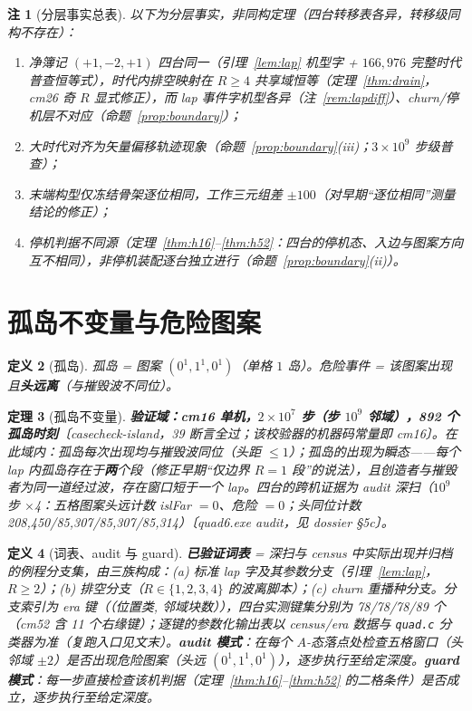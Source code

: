 \documentclass[11pt]{ctexart}
\newtheorem{theorem}{定理}[section]
\newtheorem{definition}[theorem]{定义}
\newtheorem{remark}[theorem]{注}
\begin{document}
\begin{remark}[分层事实总表]
以下为分层事实，非同构定理（四台转移表各异，转移级同构不存在）：
\begin{enumerate}
\item 净簿记 $(+1,-2,+1)$ 四台同一（引理~\ref{lem:lap} 机型字 + $166{,}976$ 完整时代普查恒等式），时代内排空映射在 $R\ge4$ 共享域恒等（定理~\ref{thm:drain}，cm26 奇 $R$ 显式修正），而 lap 事件字机型各异（注~\ref{rem:lapdiff}）、churn/停机层不对应（命题~\ref{prop:boundary}）；
\item 大时代对齐为矢量偏移轨迹现象（命题~\ref{prop:boundary}(iii)；$3\times10^9$ 步级普查）；
\item 末端构型仅冻结骨架逐位相同，工作三元组差 $\pm100$（对早期``逐位相同''测量结论的修正）；
\item 停机判据不同源（定理~\ref{thm:h16}--\ref{thm:h52}：四台的停机态、入边与图案方向互不相同），非停机装配逐台独立进行（命题~\ref{prop:boundary}(ii)）。
\end{enumerate}
\end{remark}

\section{孤岛不变量与危险图案}

\begin{definition}[孤岛]
孤岛 = 图案 $(0^1,1^1,0^1)$（单格 $1$ 岛）。危险事件 = 该图案出现且\textbf{头远离}（与摧毁波不同位）。
\end{definition}

\begin{theorem}[孤岛不变量]\label{thm:island}
\textbf{验证域：cm16 单机，$2\times10^7$ 步（步 $10^9$ 邻域），892 个孤岛时刻}〔casecheck-island，39 断言全过；该校验器的机器码常量即 cm16〕。在此域内：孤岛每次出现均与摧毁波同位（头距 $\le1$）；孤岛的出现为瞬态——每个 lap 内孤岛存在于\textbf{两}个段（修正早期``仅边界 $R{=}1$ 段''的说法），且创造者与摧毁者为同一道经过波，存在窗口短于一个 lap。四台的跨机证据为 audit 深扫（$10^9$ 步 $\times$4：五格图案头远计数 islFar $=0$、危险 $=0$；头同位计数 208,450/85,307/85,307/85,314）〔quad6.exe audit，见 dossier §5c〕。
\end{theorem}

\begin{definition}[词表、audit 与 guard]
\textbf{已验证词表} = 深扫与 census 中实际出现并归档的例程分支集，由三族构成：(a) 标准 lap 字及其参数分支（引理~\ref{lem:lap}，$R\ge2$）；(b) 排空分支（$R\in\{1,2,3,4\}$ 的波离脚本）；(c) churn 重播种分支。分支索引为 era 键（（位置类, 邻域块数）），四台实测键集分别为 78/78/78/89 个（cm52 含 11 个右缘键）；逐键的参数化输出表以 census/era 数据与 \texttt{quad.c} 分类器为准（复跑入口见文末）。\textbf{audit 模式}：在每个 $A$-态落点处检查五格窗口（头邻域 $\pm2$）是否出现危险图案（头远 $(0^1,1^1,0^1)$），逐步执行至给定深度。\textbf{guard 模式}：每一步直接检查该机判据（定理~\ref{thm:h16}--\ref{thm:h52} 的二格条件）是否成立，逐步执行至给定深度。
\end{definition}
\end{document}
